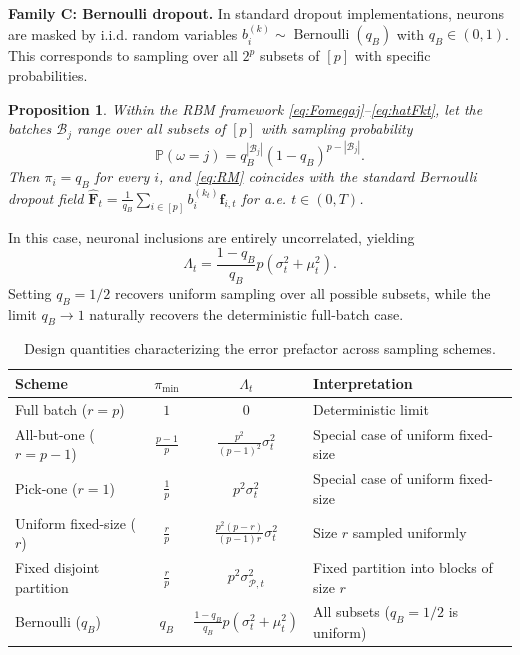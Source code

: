 \documentclass[twoside,11pt]{article}
\theoremstyle{plain}
\newtheorem{proposition}[theorem]{Proposition}
\def\to{\rightarrow}
\newcommand{\bff}{\mathbf{f}}
\newcommand{\bfF}{\mathbf{F}}
\begin{document}
\noindent\textbf{Family C: Bernoulli dropout.} In standard dropout implementations, neurons are masked by i.i.d. random variables $b_i^{(k)} \sim \operatorname{Bernoulli}(q_B)$ with $q_B\in(0,1)$. This corresponds to sampling over all $2^p$ subsets of $[p]$ with specific probabilities.
\begin{proposition}\label{prop:bern-as-rbm}
Within the RBM framework \eqref{eq:Fomegaj}--\eqref{eq:hatFkt}, let the batches $\mathcal{B}_j$ range over all subsets of $[p]$ with sampling probability
\begin{equation}\label{eq:prob.bern}
\mathbb{P}(\omega=j) = q_B^{|\mathcal{B}_j|}(1-q_B)^{p-|\mathcal{B}_j|}.
\end{equation}
Then $\pi_i=q_B$ for every $i$, and \eqref{eq:RM} coincides with the standard Bernoulli dropout field $\hat{\bfF}_t = \frac{1}{q_B}\sum_{i\in[p]} b_i^{(k_t)}\bff_{i,t}$ for a.e. $t\in(0,T)$.
\end{proposition}
In this case, neuronal inclusions are entirely uncorrelated, yielding
\begin{equation*}
\Lambda_t = \frac{1-q_B}{q_B} p(\sigma_t^2+\mu_t^2).
\end{equation*}
Setting $q_B=1/2$ recovers uniform sampling over all possible subsets, while the limit $q_B \to 1$ naturally recovers the deterministic full-batch case. 



\begin{table}[ht]
\centering
\renewcommand{\arraystretch}{1.3}
\begin{tabular}{lccl}
\toprule
\textbf{Scheme} & $\pi_{\min}$ & $\Lambda_t$ & \textbf{Interpretation} \\
\midrule
Full batch ($r=p$) & $1$ & $0$ & Deterministic limit \\
All-but-one ($r=p-1$) & $\frac{p-1}{p}$ & $\frac{p^2}{(p-1)^2}\sigma_t^2$ & Special case of uniform fixed-size \\
Pick-one ($r=1$) & $\frac{1}{p}$ & $p^2\sigma_t^2$ & Special case of uniform fixed-size \\
Uniform fixed-size ($r$) & $\frac{r}{p}$ & $\frac{p^2(p-r)}{(p-1)r}\sigma_t^2$ & Size $r$ sampled uniformly \\
Fixed disjoint partition & $\frac{r}{p}$ & $p^2 \sigma_{\mathcal{P},t}^2$ & Fixed partition into blocks of size $r$ \\
Bernoulli ($q_B$) & $q_B$ & $\frac{1-q_B}{q_B}p(\sigma_t^2+\mu_t^2)$ & All subsets ($q_B=1/2$ is uniform) \\
\bottomrule
\end{tabular}
\caption{Design quantities characterizing the error prefactor across sampling schemes.}
\label{tab:as}
\end{table}
\end{document}
